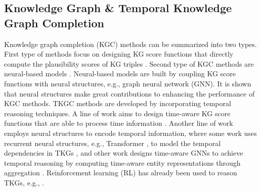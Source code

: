 \documentclass[runningheads]{llncs}
\begin{document}
\subsection{Knowledge Graph \& Temporal Knowledge Graph Completion}
Knowledge graph completion (KGC) methods can be summarized into two types. First type of methods focus on designing KG score functions that directly compute the plausibility scores of KG triples \cite{DBLP:conf/nips/BordesUGWY13,DBLP:conf/aaai/LinLSLZ15,DBLP:conf/nips/AbboudCLS20,DBLP:conf/icml/NickelTK11,DBLP:journals/corr/YangYHGD14a,DBLP:conf/icml/TrouillonWRGB16,DBLP:conf/emnlp/BalazevicAH19}. 
Second type of KGC methods are neural-based models \cite{DBLP:conf/esws/SchlichtkrullKB18,DBLP:conf/iclr/VashishthSNT20}. Neural-based models are built by coupling KG score functions with neural structures, e.g., graph neural network (GNN). It is shown that neural structures make great contributions to enhancing the performance of KGC methods.
TKGC methods are developed by incorporating temporal reasoning techniques. A line of work aims to design time-aware KG score functions that are able to process time information \cite{DBLP:conf/www/LeblayC18,DBLP:conf/coling/XuNAYL20,DBLP:conf/aaai/SadeghianACW21,DBLP:conf/aaai/MessnerAC22,DBLP:conf/acl/ChenWLL22,DBLP:conf/cikm/ZhangZ0ZX022}. Another line of work employs neural structures to encode temporal information, where some work uses recurrent neural structures, e.g., Transformer \cite{DBLP:conf/nips/VaswaniSPUJGKP17}, to model the temporal dependencies in TKGs \cite{DBLP:conf/emnlp/WuCCH20}, and other work designs time-aware GNNs to achieve temporal reasoning by computing time-aware entity representations through aggregation \cite{DBLP:conf/kdd/JungJK21,ding2022simple}.
Reinforcement learning (RL) has already been used to reason TKGs, e.g., \cite{DBLP:conf/emnlp/SunZMH021,DBLP:conf/acl/LiJGLGWC20}.
\end{document}
